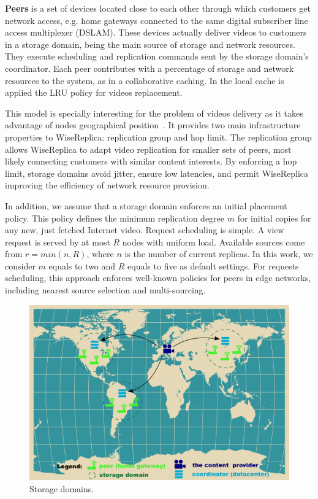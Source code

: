 \noindent
\textbf{Peers} is a set of devices located close to each other through which customers get network access, e.g. home gateways connected to the same digital subscriber line access multiplexer (DSLAM). These devices actually deliver videos to customers in a storage domain, being the main source of storage and network resources. They execute scheduling and replication commands sent by the storage domain's coordinator. Each peer contributes with a percentage of storage and network resources to the system, as in a collaborative caching. In the local cache is applied the LRU policy for videos replacement.

This model is specially interesting for the problem of videos delivery as it takes advantage of nodes geographical position~\cite{Brodersen_www_2012}. It provides two main infrastructure properties to WiseReplica: replication group and hop limit.  The replication group allows WiseReplica to adapt video replication for smaller sets of peers, most likely connecting customers with similar content interests. By enforcing a hop limit, storage domains avoid jitter, ensure low latencies, and permit WiseReplica improving  the efficiency of network resource provision. 

In addition, we assume that a storage domain enforces an initial placement policy. This policy defines the minimum replication degree $m$ for initial copies for any new, just fetched Internet video.  Request scheduling is simple. A view request is served by at most $R$ nodes with uniform load. Available sources come from $r=min(n,R)$, where $n$ is the number of current replicas. In this work, we consider $m$ equals to two and $R$ equals to five as default settings. For requests scheduling, this approach enforces well-known policies for peers in edge networks, including nearest source selection and multi-sourcing. 


\begin{figure}[htbp]
  \centering
  \begin{minipage}[t]{1\linewidth}
    \includegraphics[width=1\textwidth]{inputs/img/sd}
    \caption{Storage domains.}
    \label{fig:storage_domain}
  \end{minipage}
\end{figure}

